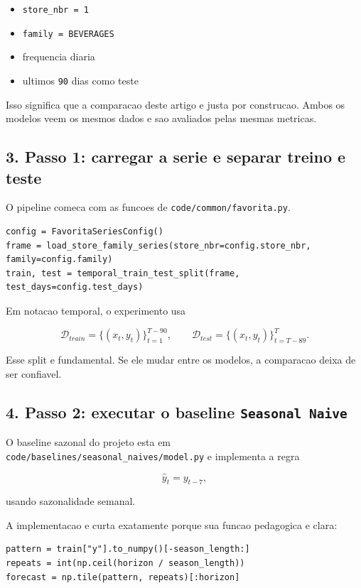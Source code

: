 \documentclass[12pt]{article}
\providecommand{\tightlist}{%
          \setlength{\itemsep}{0pt}\setlength{\parskip}{0pt}}
\begin{document}
\begin{itemize}
\tightlist
\item
  \texttt{store\_nbr\ =\ 1}
\item
  \texttt{family\ =\ BEVERAGES}
\item
  frequencia diaria
\item
  ultimos \texttt{90} dias como teste
\end{itemize}

Isso significa que a comparacao deste artigo e justa por construcao. Ambos os modelos veem os mesmos dados e sao avaliados pelas mesmas metricas.

\subsection{3. Passo 1: carregar a serie e separar treino e teste}\label{3-passo-1-carregar-a-serie-e-separar-treino-e-teste}

O pipeline comeca com as funcoes de \texttt{code/common/favorita.py}.

\begin{verbatim}
config = FavoritaSeriesConfig()
frame = load_store_family_series(store_nbr=config.store_nbr, family=config.family)
train, test = temporal_train_test_split(frame, test_days=config.test_days)
\end{verbatim}

Em notacao temporal, o experimento usa

\[
\mathcal{D}_{train} = \{(x_t, y_t)\}_{t=1}^{T-90},
\qquad
\mathcal{D}_{test} = \{(x_t, y_t)\}_{t=T-89}^T.
\]

Esse split e fundamental. Se ele mudar entre os modelos, a comparacao deixa de ser confiavel.

\subsection{\texorpdfstring{4. Passo 2: executar o baseline \texttt{Seasonal\ Naive}}{4. Passo 2: executar o baseline Seasonal Naive}}\label{4-passo-2-executar-o-baseline-seasonal-naive}

O baseline sazonal do projeto esta em \texttt{code/baselines/seasonal\_naives/model.py} e implementa a regra

\[
\hat{y}_t = y_{t-7},
\]

usando sazonalidade semanal.

A implementacao e curta exatamente porque sua funcao pedagogica e clara:

\begin{verbatim}
pattern = train["y"].to_numpy()[-season_length:]
repeats = int(np.ceil(horizon / season_length))
forecast = np.tile(pattern, repeats)[:horizon]
\end{verbatim}
\end{document}
